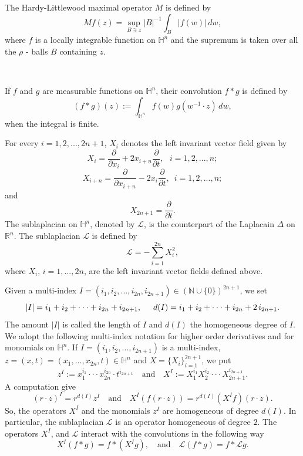 \documentclass[oneside,10pt]{article}
\begin{document}
The Hardy-Littlewood maximal operator $M$ is defined by
\[
Mf(z) = \sup_{B \ni z} |B|^{-1}\int_{B} |f(w)| \, dw,
\]
where $f$ is a locally integrable function on $\mathbb{H}^{n}$ and the supremum is taken over all the $\rho$ - balls $B$ containing $z$.

\

If $f$ and $g$ are measurable functions on $\mathbb{H}^{n}$, their convolution $f * g$ is defined by
\[
(f * g)(z) := \int_{\mathbb{H}^{n}} f(w) g(w^{-1} \cdot z) \, dw,
\]
when the integral is finite.

For every $i = 1,2, ..., 2n+1$, $X_i$ denotes the left invariant vector field given by
\[
X_i = \frac{\partial}{\partial x_i} + 2 x_{i+n} \frac{\partial}{\partial t}, \,\,\,\, i=1, 2, ..., n;
\]
\[
X_{i+n} = \frac{\partial}{\partial x_{i+n}} - 2 x_{i} \frac{\partial}{\partial t}, \,\,\, i=1, 2, ..., n;
\]
and
\[
X_{2n+1} = \frac{\partial}{\partial t}.
\]
The sublaplacian on $\mathbb{H}^n$, denoted by $\mathcal{L}$, is the counterpart of the Laplacain $\Delta$ on $\mathbb{R}^n$. The sublaplacian $\mathcal{L}$ is defined by
\[
\mathcal{L} =- \sum_{i=1}^{2n} X_i^2,
\]
where $X_i$, $i= 1, ..., 2n$, are the left invariant vector fields defined above.

Given a multi-index $I=(i_1,i_2, ..., i_{2n}, i_{2n+1}) \in (\mathbb{N} \cup \{ 0 \})^{2n+1}$, we set
\[
|I| = i_1 + i_2 + \cdot \cdot \cdot + i_{2n} + i_{2n+1}, \hspace{.5cm} d(I) = i_1 + i_2 + \cdot \cdot \cdot + i_{2n} + 2 \, i_{2n+1}.
\]
The amount $|I|$ is called the length of $I$ and $d(I)$ the homogeneous degree of $I$. We adopt the following multi-index notation for
higher order derivatives and for monomials on $\mathbb{H}^{n}$. If $I=(i_1, i_2, ..., i_{2n+1})$ is a multi-index,  
$z = (x,t) = (x_1, ..., x_{2n}, t) \in \mathbb{H}^{n}$ and $X = \{ X_i \}_{i=1}^{2n+1}$, we put
\[
z^{I} := x_{1}^{i_1} \cdot \cdot \cdot x_{2n}^{i_{2n}} \cdot t^{i_{2n+1}} \,\,\,\,\,\, \text{and} \,\,\,\,\,\, 
X^{I} := X_{1}^{i_1} X_{2}^{i_2} \cdot \cdot \cdot X_{2n+1}^{i_{2n+1}}.
\]
A computation give
\[
(r\cdot z)^{I} = r^{d(I)} z^{I} \,\,\,\,\,\, \text{and}  \,\,\,\,\,\, X^{I}(f(r \cdot z)) = r^{d(I)} (X^{I}f)(r\cdot z).
\]
So, the operators $X^{I}$ and the monomials $z^{I}$ are homogeneous of degree $d(I)$. In particular, the 
sublaplacian $\mathcal{L}$ is an operator homogeneous of degree $2$. The operators $X^{I}$, and $\mathcal{L}$  
interact with the convolutions in the following way
\[
X^{I}(f \ast g) = f \ast (X^{I}g), \,\,\,\,\,\, \text{and} \,\,\,\,\,\, \mathcal{L} (f \ast g) = f \ast \mathcal{L}g.
\]
\end{document}
